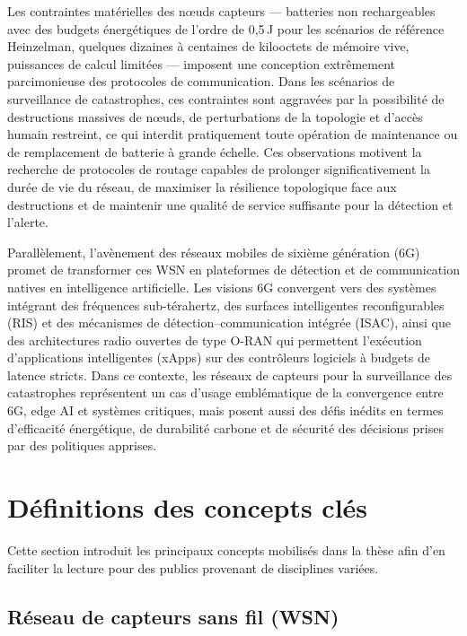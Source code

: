 Les contraintes matérielles des nœuds capteurs — batteries non rechargeables avec des budgets énergétiques de l'ordre de 0{,}5\,J pour les scénarios de référence Heinzelman, quelques dizaines à centaines de kilooctets de mémoire vive, puissances de calcul limitées — imposent une conception extrêmement parcimonieuse des protocoles de communication\cite{heinzelman2000leach,heinzelman2002leach,dietrich2009lifetime}. Dans les scénarios de surveillance de catastrophes, ces contraintes sont aggravées par la possibilité de destructions massives de nœuds, de perturbations de la topologie et d'accès humain restreint, ce qui interdit pratiquement toute opération de maintenance ou de remplacement de batterie à grande échelle\cite{erdelj2017disaster,alsayyed2025disaster}. Ces observations motivent la recherche de protocoles de routage capables de prolonger significativement la durée de vie du réseau, de maximiser la résilience topologique face aux destructions et de maintenir une qualité de service suffisante pour la détection et l'alerte.

Parallèlement, l'avènement des réseaux mobiles de sixième génération (6G) promet de transformer ces WSN en plateformes de détection et de communication natives en intelligence artificielle. Les visions 6G convergent vers des systèmes intégrant des fréquences sub-térahertz, des surfaces intelligentes reconfigurables (RIS) et des mécanismes de détection--communication intégrée (ISAC), ainsi que des architectures radio ouvertes de type O-RAN qui permettent l'exécution d'applications intelligentes (xApps) sur des contrôleurs logiciels à budgets de latence stricts\cite{saad2020vision6g,polese2023oran,oran_official_architecture,etri_6g_disaster2024}. Dans ce contexte, les réseaux de capteurs pour la surveillance des catastrophes représentent un cas d'usage emblématique de la convergence entre 6G, edge AI et systèmes critiques, mais posent aussi des défis inédits en termes d'efficacité énergétique, de durabilité carbone et de sécurité des décisions prises par des politiques apprises.

\section{Définitions des concepts clés}\label{sec:intro-definitions}

Cette section introduit les principaux concepts mobilisés dans la thèse afin d'en faciliter la lecture pour des publics provenant de disciplines variées.

\subsection*{Réseau de capteurs sans fil (WSN)}

